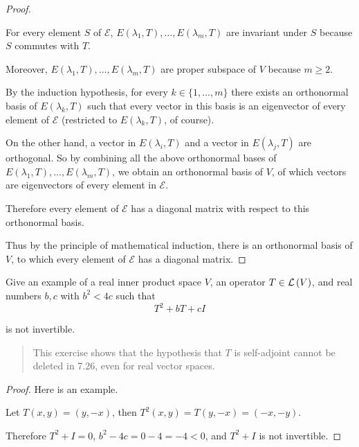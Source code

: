 \begin{proof}
\begin{itemize}
              For every element $S$ of $\mathcal{E}$, $E(\lambda_{1}, T), \ldots, E(\lambda_{m}, T)$ are invariant under $S$ because $S$ commutes with $T$.

              Moreover, $E(\lambda_{1}, T), \ldots, E(\lambda_{m}, T)$ are proper subspace of $V$ because $m\geq 2$.

              By the induction hypothesis, for every $k\in\{1,\ldots, m\}$ there exists an orthonormal basis of $E(\lambda_{k}, T)$ such that every vector in this basis is an eigenvector of every element of $\mathcal{E}$ (restricted to $E(\lambda_{k}, T)$, of course).

              On the other hand, a vector in $E(\lambda_{i}, T)$ and a vector in $E(\lambda_{j}, T)$ are orthogonal. So by combining all the above orthonormal bases of $E(\lambda_{1}, T), \ldots, E(\lambda_{m}, T)$, we obtain an orthonormal basis of $V$, of which vectors are eigenvectors of every element in $\mathcal{E}$.

              Therefore every element of $\mathcal{E}$ has a diagonal matrix with respect to this orthonormal basis.
    \end{itemize}

    Thus by the principle of mathematical induction, there is an orthonormal basis of $V$, to which every element of $\mathcal{E}$ has a diagonal matrix.
\end{proof}
\newpage

\begin{exercise}
    Give an example of a real inner product space $V$, an operator $T \in \mathcal{L}\left({V}\right)$, and real numbers $b, c$ with $b^{2} < 4c$ such that
    \[
        T^{2} + bT + cI
    \]

    is not invertible.
\end{exercise}

\begin{quote}
    This exercise shows that the hypothesis that $T$ is self-adjoint cannot be deleted in 7.26, even for real vector spaces.
\end{quote}

\begin{proof}
    Here is an example.

    Let $T(x, y) = (y, -x)$, then $T^{2}(x, y) = T(y, -x) = (-x, -y)$.

    Therefore $T^{2} + I = 0$, $b^{2} - 4c = 0 - 4 = -4 < 0$, and $T^{2} + I$ is not invertible.
\end{proof}
\newpage

